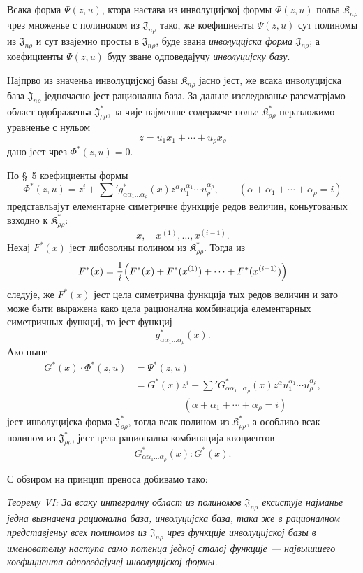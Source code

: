 ﻿\documentclass[11pt]{article}
\providecommand{\Kfield}{\mathfrak{K}}
\providecommand{\Jdom}{\mathfrak{J}}
\begin{document}
Всака форма $\Psi(z,u)$, ктора настава из инволуцијској формы $\Phi(z,u)$ польа $\Kfield_{n\rho}$ чрез множенье с полиномом из $\Jdom_{n\rho}$ тако, же коефициенты $\Psi(z,u)$ сут полиномы из $\Jdom_{n\rho}$ и сут взајемно просты в $\Jdom_{n\rho}$, буде звана {\itshape инволуцијска форма} $\Jdom_{n\rho}$; а коефициенты $\Psi(z,u)$ буду зване одповедајучу {\itshape инволуцијску базу}.

Најпрво из значеньа инволуцијској базы $\Kfield_{n\rho}$ јасно јест, же всака инволуцијска база $\Jdom_{n\rho}$ једночасно јест рационална база. За дальне изследованье разсматрјамо област одображеньа $\Jdom^*_{\rho\rho}$, за чије најменше содержече полье $\Kfield^*_{\rho\rho}$ неразложимо уравненье с нульом
\[
  z=u_1x_1+\cdots+u_\rho x_\rho
\]
дано јест чрез $\Phi^*(z,u)=0$.

По \S\ 5 коефициенты формы
\[
  \Phi^*(z,u)=z^i+\sum{}' g^*_{\alpha\alpha_1\ldots\alpha_\rho}(x)
  z^\alpha u_1^{\alpha_1}\cdots u_\rho^{\alpha_\rho},
  \qquad
  (\alpha+\alpha_1+\cdots+\alpha_\rho=i)
\]
представльајут елементарне симетричне функције редов величин, коньугованых взходно к $\Kfield^*_{\rho\rho}$:
\[
  x,\quad x^{(1)},\ldots,x^{(i-1)}.
\]
Нехај $F^*(x)$ јест либоволны полином из $\Kfield^*_{\rho\rho}$. Тогда из
\[
  F^*(x)=\frac1i\Bigl(F^*(x)+F^*(x^{(1)})+
  \cdots+F^*(x^{(i-1)})\Bigr)
\]
следује, же $F^*(x)$ јест цела симетрична функција тых редов величин и зато може быти выражена како цела рационална комбинација елементарных симетричных функциј, то јест функциј
\[
  g^*_{\alpha\alpha_1\ldots\alpha_\rho}(x).
\]
Ако ныне
\[
\begin{aligned}
  G^*(x)\cdot\Phi^*(z,u)
  &=\Psi^*(z,u)\\
  &=G^*(x)z^i+
    \sum{}'G^*_{\alpha\alpha_1\ldots\alpha_\rho}(x)
    z^\alpha u_1^{\alpha_1}\cdots u_\rho^{\alpha_\rho},\\
  &\hspace{5em}(\alpha+\alpha_1+\cdots+\alpha_\rho=i)
\end{aligned}
\]
јест инволуцијска форма $\Jdom^*_{\rho\rho}$, тогда всак полином из $\Kfield^*_{\rho\rho}$, а особливо всак полином из $\Jdom^*_{\rho\rho}$, јест цела рационална комбинација квоциентов
\[
  G^*_{\alpha\alpha_1\ldots\alpha_\rho}(x):G^*(x).
\]

С обзиром на принцип преноса добивамо тако:

{\itshape Теорему VI: За всаку интегралну област из полиномов $\Jdom_{n\rho}$ ексистује најманье једна вызначена рационална база, инволуцијска база, така же в рационалном представјеньу всех полиномов из $\Jdom_{n\rho}$ чрез функције инволуцијској базы в именовательу наступа само потенца једној сталој функције --- највышшего коефициента одповедајучеј инволуцијској формы.}
\end{document}
